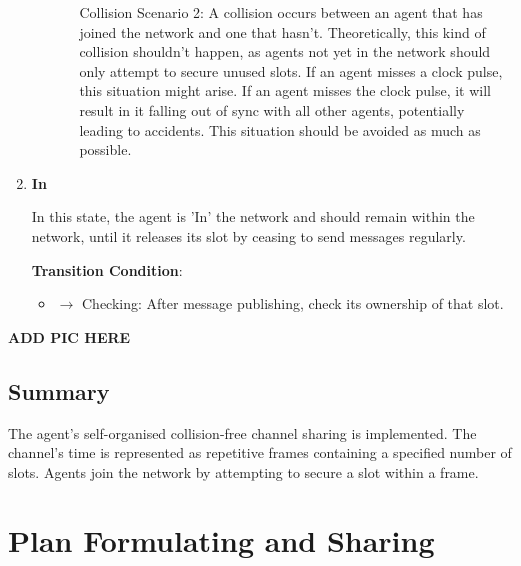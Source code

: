 \begin{enumerate}
\begin{itemize}
\begin{itemize}
            Collision Scenario 2: A collision occurs between an agent that has joined the network and one that hasn't. Theoretically, this kind of collision shouldn't happen, as agents not yet in the network should only attempt to secure unused slots. If an agent misses a clock pulse, this situation might arise. If an agent misses the clock pulse, it will result in it falling out of sync with all other agents, potentially leading to accidents. This situation should be avoided as much as possible.

        \end{itemize}
    \end{itemize}

    \item \textbf{In}
    
    In this state, the agent is 'In' the network and should remain within the network, until it releases its slot by ceasing to send messages regularly.
    
    \textbf{Transition Condition}:
    \begin{itemize}
        \item $\rightarrow$ Checking: After message publishing, check its ownership of that slot.
    \end{itemize}

\end{enumerate}

\textbf{ADD PIC HERE} %

\subsection{Summary}

The agent's self-organised collision-free channel sharing is implemented. The channel's time is represented as repetitive frames containing a specified number of slots. Agents join the network by attempting to secure a slot within a frame.

\section{Plan Formulating and Sharing}